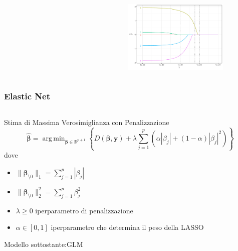 \documentclass[pdf, aspectratio=169]{beamer}\usepackage[]{graphicx}\usepackage[]{color}
\DeclareMathOperator*{\argmin}{arg\,min}  %
\theoremstyle{definition}
\begin{document}
\begin{frame}
\begin{columns}[c]
\begin{column}{0.55\linewidth}
\begin{figure}
\begin{subfigure}[b]{3cm}
    \end{subfigure}
  \end{figure}
\end{column}
\begin{column}{0.45\linewidth}
  \begin{figure}
    \centering
    \includegraphics[width=5cm]{_bookdown_files/_main_files/figure-latex/lasso-lambda-5.pdf}
  \end{figure}
\end{column}
\end{columns}

\end{frame}

\begin{frame}
\frametitle{Elastic Net}

\fontsize{9pt}{11pt}\selectfont

\begin{columns}
\begin{column}{0.8\linewidth}
  \begin{block}{Stima di Massima Verosimiglianza con Penalizzazione}
    $$
    \hat{\boldsymbol{\beta}} = \argmin_{\boldsymbol{\beta}\in\mathbb{R}^{p+1}}{\left\{
    D(\boldsymbol{\beta}, \boldsymbol{y}) +
    \lambda 
    \sum_{j=1}^p{\left(\alpha |\beta_j| + (1 - \alpha) |\beta_j|^2\right)}
    \right\}}
    $$
    dove
    \begin{itemize}
      \item $\|\boldsymbol{\beta}_{\setminus0}\|_1 = \sum_{j=1}^p{|\beta_j|}$
      \item $\|\boldsymbol{\beta}_{\setminus0}\|_2^2 = \sum_{j=1}^p{\beta_j^2}$
      \item $\lambda\ge0$ iperparametro di penalizzazione
      \item $\alpha \in [0,1]$ iperparametro che determina il peso della LASSO
    \end{itemize}
    
    \vspace{0.2cm}
    
    Modello sottostante:GLM
  \end{block}
\end{column}
\end{columns}

\end{frame}
\end{document}
